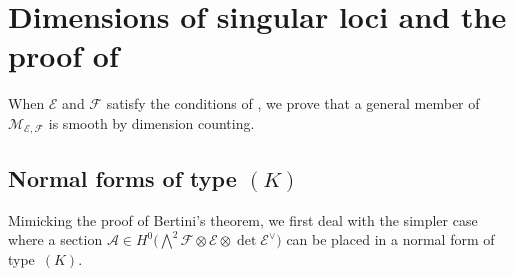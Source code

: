 \documentclass[11pt]{amsart}
\numberwithin{theorem}{section}
\numberwithin{equation}{section}
\theoremstyle{definition}\newtheorem{defn}[theorem]{Definition}
\theoremstyle{definition}\newtheorem{remark}[theorem]{Remark}
\theoremstyle{definition}\newtheorem{question}[theorem]{Question}
\theoremstyle{definition}\newtheorem{problem}[theorem]{Problem}
\newcommand{\cE}{\mathcal{E}}
\newcommand{\cF}{\mathcal{F}}
\newcommand{\cM}{\mathcal{M}}
\newcommand{\cA}{\mathcal{A}}
\newcommand{\K}{K}
\begin{document}
\section{Dimensions of singular loci and the proof of \texorpdfstring{}{Theorem 1.5}}
\label{sec:dim-counting}

When $\cE$ and $\cF$ satisfy the conditions of , we prove that a general member of $\cM_{\cE,\cF}$ is smooth by dimension counting. 

\subsection{Normal forms of type $(\K)$}
Mimicking the proof of Bertini's theorem, we first deal with the simpler case where a section $\cA \in H^0 \Big(\bigwedge\nolimits^2 \cF \otimes \cE \otimes \det \cE^\vee \Big)$ can be placed in a normal form of type~$(\K)$.
\end{document}
